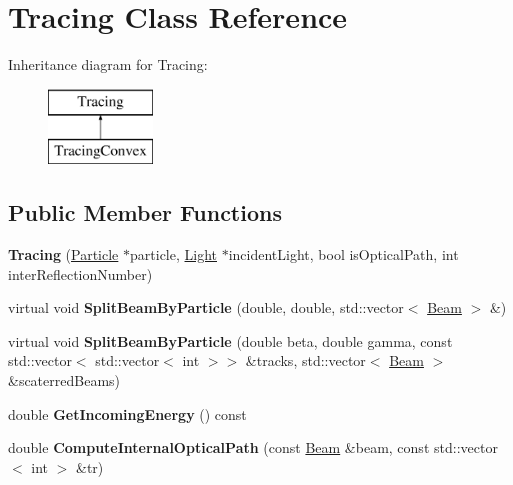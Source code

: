 \hypertarget{class_tracing}{}\section{Tracing Class Reference}
\label{class_tracing}
Inheritance diagram for Tracing\+:\begin{figure}[H]
\begin{center}
\leavevmode
\includegraphics[height=2.000000cm]{class_tracing}
\end{center}
\end{figure}
\subsection*{Public Member Functions}
\begin{DoxyCompactItemize}
\item 
\mbox{\label{class_tracing_acd69ed15b6ee7ec09bb032d8d1988ac3}} 
{\bfseries Tracing} (\mbox{\hyperlink{class_particle}{Particle}} $\ast$particle, \mbox{\hyperlink{class_light}{Light}} $\ast$incident\+Light, bool is\+Optical\+Path, int inter\+Reflection\+Number)
\item 
\mbox{\label{class_tracing_a6bab64b22d0a0821ce687bee1ce134d2}} 
virtual void {\bfseries Split\+Beam\+By\+Particle} (double, double, std\+::vector$<$ \mbox{\hyperlink{class_beam}{Beam}} $>$ \&)
\item 
\mbox{\label{class_tracing_acbe2779573da6b926db3ddd79f9d2e91}} 
virtual void {\bfseries Split\+Beam\+By\+Particle} (double beta, double gamma, const std\+::vector$<$ std\+::vector$<$ int $>$$>$ \&tracks, std\+::vector$<$ \mbox{\hyperlink{class_beam}{Beam}} $>$ \&scaterred\+Beams)
\item 
\mbox{\label{class_tracing_abdc4eaa61b6c1084d6091fe0b5c8496e}} 
double {\bfseries Get\+Incoming\+Energy} () const
\item 
\mbox{\label{class_tracing_afd7ac36166da74e5f61f96d8373155d2}} 
double {\bfseries Compute\+Internal\+Optical\+Path} (const \mbox{\hyperlink{class_beam}{Beam}} \&beam, const std\+::vector$<$ int $>$ \&tr)
\end{DoxyCompactItemize}

